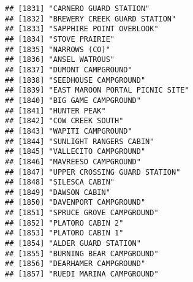 \documentclass[
]{article}
\begin{document}
\begin{verbatim}
## [1831] "CARNERO GUARD STATION"                                                               
## [1832] "BREWERY CREEK GUARD STATION"                                                         
## [1833] "SAPPHIRE POINT OVERLOOK"                                                             
## [1834] "STOVE PRAIRIE"                                                                       
## [1835] "NARROWS (CO)"                                                                        
## [1836] "ANSEL WATROUS"                                                                       
## [1837] "DUMONT CAMPGROUND"                                                                   
## [1838] "SEEDHOUSE CAMPGROUND"                                                                
## [1839] "EAST MAROON PORTAL PICNIC SITE"                                                      
## [1840] "BIG GAME CAMPGROUND"                                                                 
## [1841] "HUNTER PEAK"                                                                         
## [1842] "COW CREEK SOUTH"                                                                     
## [1843] "WAPITI CAMPGROUND"                                                                   
## [1844] "SUNLIGHT RANGERS CABIN"                                                              
## [1845] "VALLECITO CAMPGROUND"                                                                
## [1846] "MAVREESO CAMPGROUND"                                                                 
## [1847] "UPPER CROSSING GUARD STATION"                                                        
## [1848] "SILESCA CABIN"                                                                       
## [1849] "DAWSON CABIN"                                                                        
## [1850] "DAVENPORT CAMPGROUND"                                                                
## [1851] "SPRUCE GROVE CAMPGROUND"                                                             
## [1852] "PLATORO CABIN 2"                                                                     
## [1853] "PLATORO CABIN 1"                                                                     
## [1854] "ALDER GUARD STATION"                                                                 
## [1855] "BURNING BEAR CAMPGROUND"                                                             
## [1856] "DEARHAMER CAMPGROUND"                                                                
## [1857] "RUEDI MARINA CAMPGROUND"                                                             

\end{verbatim}
\end{document}
